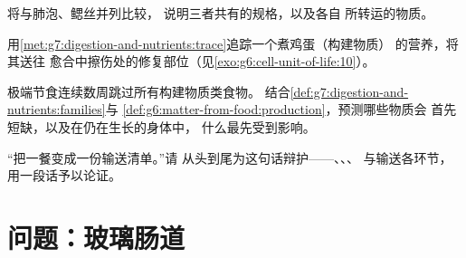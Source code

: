 \begin{exercise}[$\star\star$]\label{exo:g7:digestion-and-nutrients:9}
将与肺泡、鳃丝并列比较，
说明三者共有的规格，以及各自
所转运的物质。
\end{exercise}

\begin{exercise}[$\star\star$]\label{exo:g7:digestion-and-nutrients:10}
用\cref{met:g7:digestion-and-nutrients:trace}追踪一个煮鸡蛋（构建物质）
的营养，将其送往
愈合中擦伤处的修复部位（见\cref{exo:g6:cell-unit-of-life:10}）。
\end{exercise}

\begin{exercise}[$\star\star$]\label{exo:g7:digestion-and-nutrients:11}
极端节食连续数周跳过所有构建物质类食物。
结合\cref{def:g7:digestion-and-nutrients:families}与
\cref{def:g6:matter-from-food:production}，预测哪些物质会
首先短缺，以及在仍在生长的身体中，
什么最先受到影响。
\end{exercise}

\begin{exercise}[$\star\star\star$]\label{exo:g7:digestion-and-nutrients:12}
“把一餐变成一份输送清单。”请
从头到尾为这句话辩护——、、、
与输送各环节，用一段话予以论证。
\end{exercise}

\section{问题：玻璃肠道}

